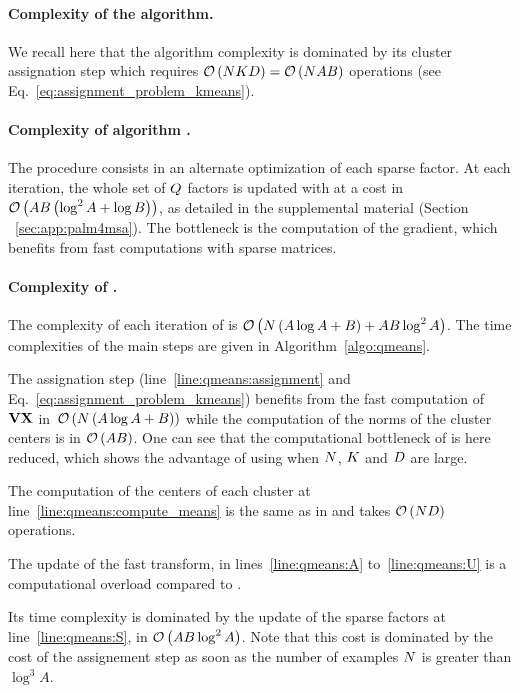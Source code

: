 \paragraph{Complexity of the \kmeans algorithm.}
We recall here that the \kmeans algorithm complexity is dominated by its cluster assignation step which requires $\mathcal{O}\left(NKD\right)=\mathcal{O}\left(N A B\right)$ operations (see Eq.~\eqref{eq:assignment_problem_kmeans}).

\paragraph{Complexity of algorithm \palm.} The procedure consists in an alternate optimization of each sparse factor. 
At each iteration, the whole set of $Q$ factors is updated with at a cost in $\mathcal{O}\left(AB\left (\log^2 A+\log B\right )\right)$, as detailed in the supplemental material (Section ~\ref{sec:app:palm4msa}). 
The bottleneck is the computation of the gradient, which benefits from fast computations with sparse matrices.


\paragraph{Complexity of \qkmeans.} The complexity of each iteration of \qkmeans is $\mathcal{O}\left(N\left(A\log A+B\right ) + AB \log^2 A\right)$. The time complexities of the main steps are given in Algorithm~\ref{algo:qmeans}. 

The assignation step (line~\ref{line:qmeans:assignment} and Eq.~\eqref{eq:assignment_problem_kmeans}) benefits from the fast computation of ${\mathbf{V}} {\mathbf{X}}$ in~$\mathcal{O}\left(N\left(A\log A+B\right )\right)$ while the computation of the norms of the cluster centers is in $\mathcal{O}\left(AB\right)$.
One can see that the computational bottleneck of \kmeans is here reduced, which shows the advantage of using \qkmeans when $N$, $K$ and $D$ are large.

The computation of the centers of each cluster at line~\ref{line:qmeans:compute_means} is the same as in \kmeans and takes $\mathcal{O}\left(ND\right)$ operations.

The update of the fast transform, in lines~\ref{line:qmeans:A} to~\ref{line:qmeans:U} is a computational overload compared to \kmeans. 

Its time complexity is dominated by the update of the sparse factors at line~\ref{line:qmeans:S}, in $\mathcal{O}\left(AB \log^2 A\right)$. 
Note that this cost is dominated by the cost of the assignement step as soon as the number of examples $N$ is greater than $\log^3 A$. 

